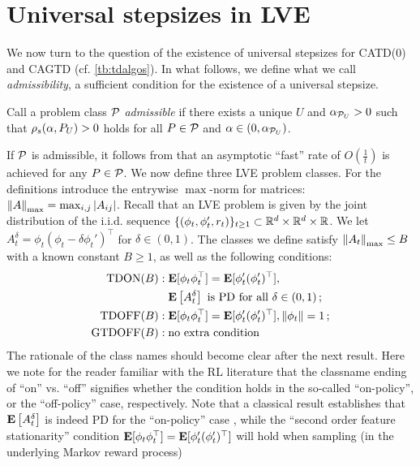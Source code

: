 \section{Universal stepsizes in LVE}\label{sec:rl}
We now turn to the question of the existence of universal stepsizes for CATD(0) and CAGTD (cf. \cref{tb:tdalgos}). 
In what follows, we define what we call \emph{admissibility}, 
a sufficient condition for the existence of a universal stepsize. 
\begin{definition}\label{def:admis}
Call a problem class $\P$ \emph{admissible} if there exists a unique $U$ and $\alpha_{\P_U}>0$ such that
$\rhos{P_U}>0$ holds for all $P\in \P$ and $\alpha\in(0,\alpha_{\P_U})$.
\end{definition}
If $\P$ is admissible, it  follows from  that an asymptotic ``fast'' rate of $O(\frac1t)$ is achieved for any $P\in \cP$. 
We now define three LVE problem classes. For the definitions introduce
the entrywise $\max$-norm for matrices: $\norm{A}_{\max} = \max_{i,j} |A_{ij}|$.
Recall that an LVE problem is given by the joint distribution of the i.i.d. sequence
$\{(\phi_t,\phi_t',r_t)\}_{t\ge 1}\subset \R^d\times \R^d \times \R$. We let 
$A_t^\delta = \phi_t(\phi_t - \delta \phi_t')^\top$ for $\delta\in (0,1)$.
The classes we define satisfy $\norm{A_t}_{\max}\le B$ with a known constant $B\ge 1$, 
as well as the following conditions:
\begin{align*}
\text{TDON}(B)&: \E[\phi_t\phi_t^\top]=\E[\phi'_t(\phi'_t)^\top], \\
						& \,\,\,\,\, \EE{A_t^\delta} \text{ is PD for all } \delta\in (0,1)\,;\\
\text{TDOFF}(B)&: \E[\phi_t\phi_t^\top]=\E[\phi'_t(\phi'_t)^\top], \norm{\phi_t}=1\,;\\
\text{GTDOFF}(B)&: \text{no extra condition}
\end{align*}
The rationale of the class names should become clear after the next result.
Here we note for the reader familiar with the RL literature that the classname ending of ``on'' vs. ``off'' signifies
whether the condition holds in the so-called ``on-policy'', or the ``off-policy'' case, respectively.
Note that a classical result establishes that $\EE{A_t^\delta}$ is indeed PD for the ``on-policy'' case
\cite{su88},
while the ``second order feature stationarity'' condition $ \E[\phi_t\phi_t^\top]=\E[\phi'_t(\phi'_t)^\top]$ will hold 
when sampling (in the underlying Markov reward process) 
